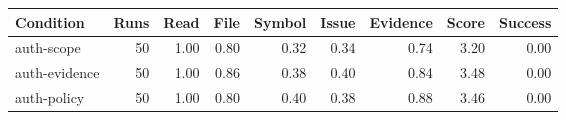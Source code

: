 \begin{tabular}{lrrrrrrrr}
\toprule
Condition & Runs & Read & File & Symbol & Issue & Evidence & Score & Success \\
\midrule
auth-scope & 50 & 1.00 & 0.80 & 0.32 & 0.34 & 0.74 & 3.20 & 0.00 \\
auth-evidence & 50 & 1.00 & 0.86 & 0.38 & 0.40 & 0.84 & 3.48 & 0.00 \\
auth-policy & 50 & 1.00 & 0.80 & 0.40 & 0.38 & 0.88 & 3.46 & 0.00 \\
\bottomrule
\end{tabular}
